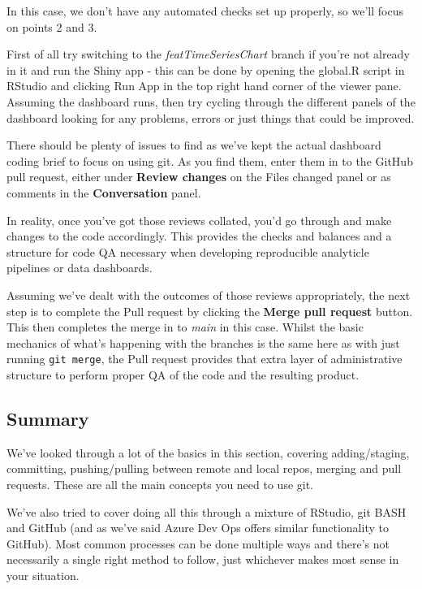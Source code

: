 \documentclass[
  12pt,
]{article}
\begin{document}
In this case, we don't have any automated checks set up properly, so
we'll focus on points 2 and 3.

First of all try switching to the \emph{featTimeSeriesChart} branch if
you're not already in it and run the Shiny app - this can be done by
opening the global.R script in RStudio and clicking Run App in the top
right hand corner of the viewer pane. Assuming the dashboard runs, then
try cycling through the different panels of the dashboard looking for
any problems, errors or just things that could be improved.

There should be plenty of issues to find as we've kept the actual
dashboard coding brief to focus on using git. As you find them, enter
them in to the GitHub pull request, either under \textbf{Review changes}
on the Files changed panel or as comments in the \textbf{Conversation}
panel.

In reality, once you've got those reviews collated, you'd go through and
make changes to the code accordingly. This provides the checks and
balances and a structure for code QA necessary when developing
reproducible analyticle pipelines or data dashboards.

Assuming we've dealt with the outcomes of those reviews appropriately,
the next step is to complete the Pull request by clicking the
\textbf{Merge pull request} button. This then completes the merge in to
\emph{main} in this case. Whilst the basic mechanics of what's happening
with the branches is the same here as with just running
\texttt{git\ merge}, the Pull request provides that extra layer of
administrative structure to perform proper QA of the code and the
resulting product.

\hypertarget{summary-1}{%
\subsection{Summary}\label{summary-1}}

We've looked through a lot of the basics in this section, covering
adding/staging, committing, pushing/pulling between remote and local
repos, merging and pull requests. These are all the main concepts you
need to use git.

We've also tried to cover doing all this through a mixture of RStudio,
git BASH and GitHub (and as we've said Azure Dev Ops offers similar
functionality to GitHub). Most common processes can be done multiple
ways and there's not necessarily a single right method to follow, just
whichever makes most sense in your situation.
\end{document}
